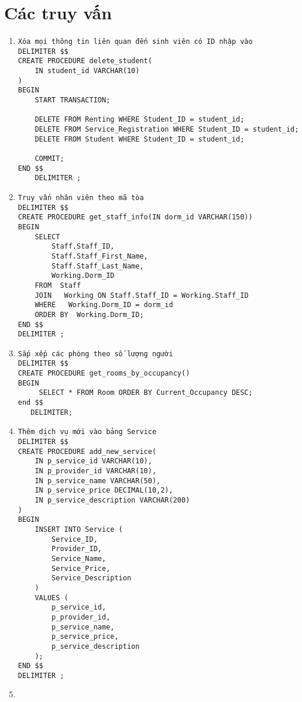 \documentclass[a4paper,12pt]{article}
\begin{document}
\section{Các truy vấn}
\begin{enumerate}
    \item \begin{verbatim}
Xóa mọi thông tin liên quan đến sinh viên có ID nhập vào 
DELIMITER $$
CREATE PROCEDURE delete_student(
    IN student_id VARCHAR(10)
)
BEGIN
    START TRANSACTION;
    
    DELETE FROM Renting WHERE Student_ID = student_id;
    DELETE FROM Service_Registration WHERE Student_ID = student_id;
    DELETE FROM Student WHERE Student_ID = student_id;
    
    COMMIT;
END $$
    DELIMITER ;
\end{verbatim}
\item \begin{verbatim}
Truy vấn nhân viên theo mã tòa
DELIMITER $$
CREATE PROCEDURE get_staff_info(IN dorm_id VARCHAR(150))
BEGIN
    SELECT 
        Staff.Staff_ID, 
        Staff.Staff_First_Name, 
        Staff.Staff_Last_Name, 
        Working.Dorm_ID
    FROM  Staff
    JOIN   Working ON Staff.Staff_ID = Working.Staff_ID
    WHERE   Working.Dorm_ID = dorm_id
    ORDER BY  Working.Dorm_ID;
END $$
DELIMITER ;
\end{verbatim}
\item \begin{verbatim}
Sắp xếp các phòng theo số lượng người 
DELIMITER $$
CREATE PROCEDURE get_rooms_by_occupancy()
BEGIN
     SELECT * FROM Room ORDER BY Current_Occupancy DESC;
end $$
   DELIMITER;
\end{verbatim}
\item \begin{verbatim}
Thêm dịch vụ mới vào bảng Service
DELIMITER $$
CREATE PROCEDURE add_new_service(
    IN p_service_id VARCHAR(10),
    IN p_provider_id VARCHAR(10),
    IN p_service_name VARCHAR(50),
    IN p_service_price DECIMAL(10,2),
    IN p_service_description VARCHAR(200)
)
BEGIN
    INSERT INTO Service (
        Service_ID, 
        Provider_ID, 
        Service_Name, 
        Service_Price, 
        Service_Description
    )
    VALUES (
        p_service_id,
        p_provider_id, 
        p_service_name,
        p_service_price,
        p_service_description
    );
END $$
DELIMITER ;
\end{verbatim}
\item \begin{verbatim}

\end{verbatim}
\end{enumerate}
\end{document}
